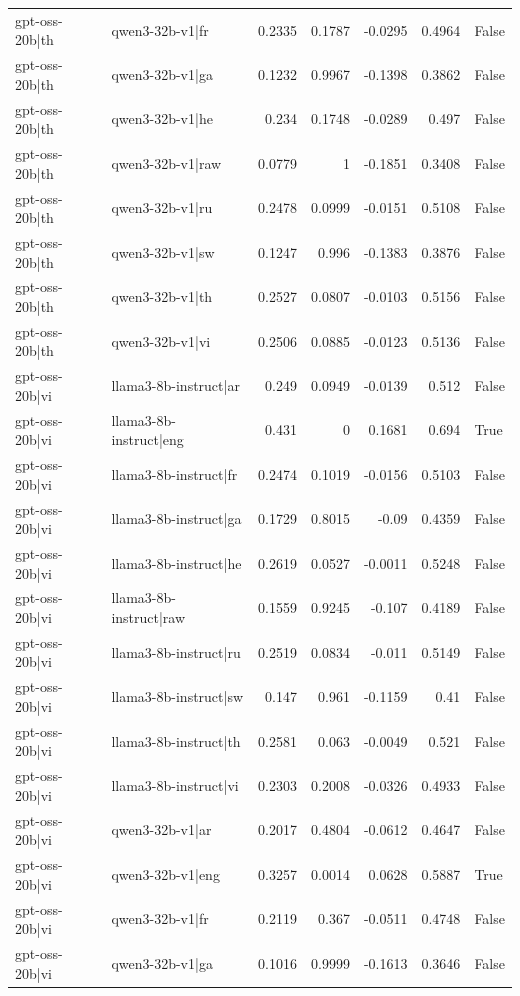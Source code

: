\begin{table}
\begin{tabular}{l l r r r r l}
gpt-oss-20b|th & qwen3-32b-v1|fr & 0.2335 & 0.1787 & -0.0295 & 0.4964 & False \\
gpt-oss-20b|th & qwen3-32b-v1|ga & 0.1232 & 0.9967 & -0.1398 & 0.3862 & False \\
gpt-oss-20b|th & qwen3-32b-v1|he & 0.234 & 0.1748 & -0.0289 & 0.497 & False \\
gpt-oss-20b|th & qwen3-32b-v1|raw & 0.0779 & 1 & -0.1851 & 0.3408 & False \\
gpt-oss-20b|th & qwen3-32b-v1|ru & 0.2478 & 0.0999 & -0.0151 & 0.5108 & False \\
gpt-oss-20b|th & qwen3-32b-v1|sw & 0.1247 & 0.996 & -0.1383 & 0.3876 & False \\
gpt-oss-20b|th & qwen3-32b-v1|th & 0.2527 & 0.0807 & -0.0103 & 0.5156 & False \\
gpt-oss-20b|th & qwen3-32b-v1|vi & 0.2506 & 0.0885 & -0.0123 & 0.5136 & False \\
gpt-oss-20b|vi & llama3-8b-instruct|ar & 0.249 & 0.0949 & -0.0139 & 0.512 & False \\
gpt-oss-20b|vi & llama3-8b-instruct|eng & 0.431 & 0 & 0.1681 & 0.694 & True \\
gpt-oss-20b|vi & llama3-8b-instruct|fr & 0.2474 & 0.1019 & -0.0156 & 0.5103 & False \\
gpt-oss-20b|vi & llama3-8b-instruct|ga & 0.1729 & 0.8015 & -0.09 & 0.4359 & False \\
gpt-oss-20b|vi & llama3-8b-instruct|he & 0.2619 & 0.0527 & -0.0011 & 0.5248 & False \\
gpt-oss-20b|vi & llama3-8b-instruct|raw & 0.1559 & 0.9245 & -0.107 & 0.4189 & False \\
gpt-oss-20b|vi & llama3-8b-instruct|ru & 0.2519 & 0.0834 & -0.011 & 0.5149 & False \\
gpt-oss-20b|vi & llama3-8b-instruct|sw & 0.147 & 0.961 & -0.1159 & 0.41 & False \\
gpt-oss-20b|vi & llama3-8b-instruct|th & 0.2581 & 0.063 & -0.0049 & 0.521 & False \\
gpt-oss-20b|vi & llama3-8b-instruct|vi & 0.2303 & 0.2008 & -0.0326 & 0.4933 & False \\
gpt-oss-20b|vi & qwen3-32b-v1|ar & 0.2017 & 0.4804 & -0.0612 & 0.4647 & False \\
gpt-oss-20b|vi & qwen3-32b-v1|eng & 0.3257 & 0.0014 & 0.0628 & 0.5887 & True \\
gpt-oss-20b|vi & qwen3-32b-v1|fr & 0.2119 & 0.367 & -0.0511 & 0.4748 & False \\
gpt-oss-20b|vi & qwen3-32b-v1|ga & 0.1016 & 0.9999 & -0.1613 & 0.3646 & False \\

\end{tabular}
\end{table}
